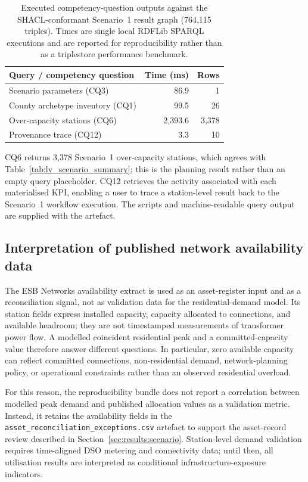 \documentclass[preprint,12pt]{elsarticle}
\begin{document}
\begin{table}[H]
\centering
\caption{Executed competency-question outputs against the SHACL-conformant
  Scenario~1 result graph (764,115 triples). Times are single local RDFLib
  SPARQL executions and are reported for reproducibility rather than as a
  triplestore performance benchmark.}
\label{tab:benchmarks}
\small
\begin{tabularx}{\textwidth}{Xrr}
\toprule
\textbf{Query / competency question} & \textbf{Time (ms)} & \textbf{Rows} \\
\midrule
Scenario parameters (CQ3)             &   86.9 &     1 \\
County archetype inventory (CQ1)      &   99.5 &    26 \\
Over-capacity stations (CQ6)          & 2{,}393.6 & 3{,}378 \\
Provenance trace (CQ12)               &    3.3 &    10 \\
\bottomrule
\end{tabularx}
\end{table}

CQ6 returns 3,378 Scenario~1 over-capacity stations, which agrees with
Table~\ref{tab:lv_scenario_summary}; this is the planning result rather
than an empty query placeholder. CQ12 retrieves the activity associated with
each materialised KPI, enabling a user to trace a station-level result back
to the Scenario~1 workflow execution. The scripts and machine-readable query
output are supplied with the artefact.

\subsection{Interpretation of published network availability data}
\label{sec:esb-comparison}

The ESB Networks availability extract is used as an asset-register input and
as a reconciliation signal, not as validation data for the residential-demand
model. Its station fields express installed capacity, capacity allocated to
connections, and available headroom; they are not timestamped measurements of
transformer power flow. A modelled coincident residential peak and a
committed-capacity value therefore answer different questions. In particular,
zero available capacity can reflect committed connections, non-residential
demand, network-planning policy, or operational constraints rather than an
observed residential overload.

For this reason, the reproducibility bundle does not report a correlation
between modelled peak demand and published allocation values as a validation
metric. Instead, it retains the availability fields in the
\texttt{asset\_reconciliation\_exceptions.csv} artefact to support the
asset-record review described in Section~\ref{sec:results:scenario}.
Station-level demand validation requires time-aligned DSO metering and
connectivity data; until then, all utilisation results are interpreted as
conditional infrastructure-exposure indicators.
\end{document}
